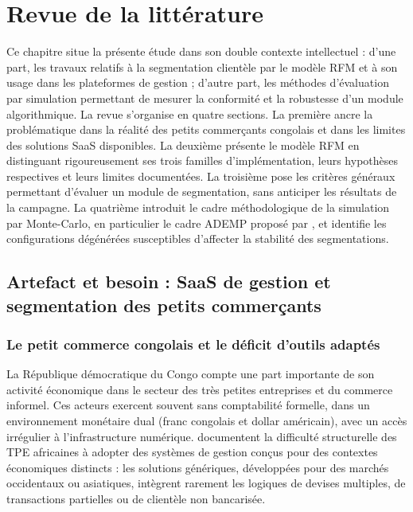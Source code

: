 \chapter{Revue de la littérature}
\label{chap:revue}

Ce chapitre situe la présente étude dans son double contexte intellectuel : d'une part, les
travaux relatifs à la segmentation clientèle par le modèle RFM et à son usage dans les
plateformes de gestion ; d'autre part, les méthodes d'évaluation par simulation permettant
de mesurer la conformité et la robustesse d'un module algorithmique. La revue s'organise en
quatre sections. La première ancre la problématique dans la réalité des petits commerçants
congolais et dans les limites des solutions SaaS disponibles. La deuxième présente le modèle
RFM en distinguant rigoureusement ses trois familles d'implémentation, leurs hypothèses
respectives et leurs limites documentées. La troisième pose les critères généraux permettant
d'évaluer un module de segmentation, sans anticiper les résultats de la campagne. La quatrième
introduit le cadre méthodologique de la simulation par Monte-Carlo, en particulier le cadre
ADEMP proposé par \citet{Morris2019}, et identifie les configurations dégénérées susceptibles
d'affecter la stabilité des segmentations.

\section{Artefact et besoin : SaaS de gestion et segmentation des petits commerçants}
\label{sec:revue-artefact}

\subsection{Le petit commerce congolais et le déficit d'outils adaptés}
\label{subsec:revue-contexte-rdc}

La République démocratique du Congo compte une part importante de son activité économique
dans le secteur des très petites entreprises et du commerce informel. Ces acteurs exercent
souvent sans comptabilité formelle, dans un environnement monétaire dual (franc congolais et
dollar américain), avec un accès irrégulier à l'infrastructure numérique. \citet{Yoseph2023}
documentent la difficulté structurelle des TPE africaines à adopter des systèmes de gestion
conçus pour des contextes économiques distincts : les solutions génériques, développées pour
des marchés occidentaux ou asiatiques, intègrent rarement les logiques de devises multiples,
de transactions partielles ou de clientèle non bancarisée.

